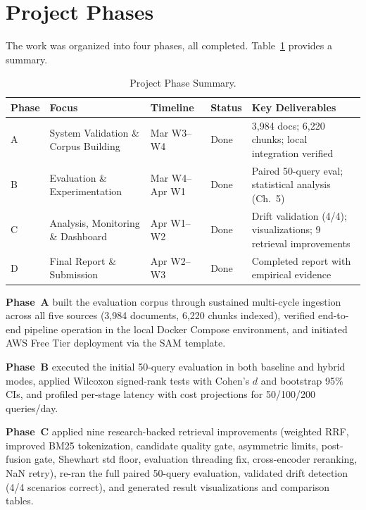 \section{Project Phases}
\label{sec:phases}

The work was organized into four phases, all completed. Table~\ref{tab:remaining_phases} provides a summary.

\begin{table}[H]
\caption{Project Phase Summary.}
\label{tab:remaining_phases}
\centering
\begin{tabular}{p{0.8cm}p{3.5cm}p{2.5cm}p{1.8cm}p{4.0cm}}
\toprule
\textbf{Phase} & \textbf{Focus} & \textbf{Timeline} & \textbf{Status} & \textbf{Key Deliverables} \\
\midrule
A & System Validation \& Corpus Building & Mar W3--W4 & Done & 3{,}984 docs; 6{,}220 chunks; local integration verified \\
B & Evaluation \& Experimentation & Mar W4--Apr W1 & Done & Paired 50-query eval; statistical analysis (Ch.~5) \\
C & Analysis, Monitoring \& Dashboard & Apr W1--W2 & Done & Drift validation (4/4); visualizations; 9 retrieval improvements \\
D & Final Report \& Submission & Apr W2--W3 & Done & Completed report with empirical evidence \\
\bottomrule
\end{tabular}
\end{table}

\textbf{Phase~A} built the evaluation corpus through sustained multi-cycle ingestion across all five sources (3{,}984 documents, 6{,}220 chunks indexed), verified end-to-end pipeline operation in the local Docker Compose environment, and initiated AWS Free Tier deployment via the SAM template.

\textbf{Phase~B} executed the initial 50-query evaluation in both baseline and hybrid modes, applied Wilcoxon signed-rank tests with Cohen's $d$ and bootstrap 95\% CIs, and profiled per-stage latency with cost projections for 50/100/200 queries/day.

\textbf{Phase~C} applied nine research-backed retrieval improvements (weighted RRF, improved BM25 tokenization, candidate quality gate, asymmetric limits, post-fusion gate, Shewhart std floor, evaluation threading fix, cross-encoder reranking, NaN retry), re-ran the full paired 50-query evaluation, validated drift detection (4/4 scenarios correct), and generated result visualizations and comparison tables.

